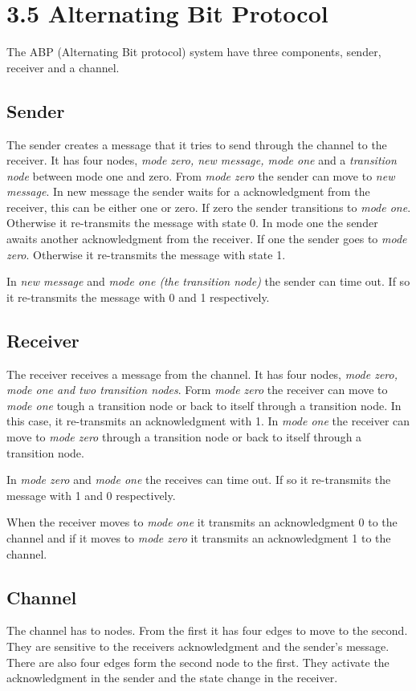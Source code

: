 \section{3.5 Alternating Bit Protocol}
\label{sec:orgbe25189}
The ABP (Alternating Bit protocol) system have three components, sender, receiver and a channel.

\subsection{Sender}
\label{sec:org7ae819b}
The sender creates a message that it tries to send through the channel to the receiver. It has four nodes, \emph{mode zero, new message, mode one} and a \emph{transition node} between mode one and zero. From \emph{mode zero} the sender can move to \emph{new message}. In new message the sender waits for a acknowledgment from the receiver, this can be either one or zero. If zero the sender transitions to \emph{mode one}. Otherwise it re-transmits the message with state 0. In mode one the sender awaits another acknowledgment from the receiver. If one the sender goes to \emph{mode zero}. Otherwise it re-transmits the message with state 1.

In \emph{new message} and \emph{mode one (the transition node)} the sender can time out. If so it re-transmits the message with 0 and 1 respectively.

\subsection{Receiver}
\label{sec:orgd6300e9}
The receiver receives a message from the channel. It has four nodes, \emph{mode zero, mode one and two transition nodes}. Form \emph{mode zero} the receiver can move to \emph{mode one} tough a transition node or back to itself through a transition node. In this case, it re-transmits an acknowledgment with 1. In \emph{mode one} the receiver can move to \emph{mode zero} through a transition node or back to itself through a transition node.

In \emph{mode zero} and \emph{mode one} the receives can time out. If so it re-transmits the message with 1 and 0 respectively.

When the receiver moves to \emph{mode one} it transmits an acknowledgment 0 to the channel and if it moves to \emph{mode zero} it transmits an acknowledgment 1 to the channel.


\subsection{Channel}
\label{sec:org3ee9f26}
The channel has to nodes. From the first it has four edges to move to the second. They are sensitive to the receivers acknowledgment and the sender's message. There are also four edges form the second node to the first. They activate the acknowledgment in the sender and the state change in the receiver.

